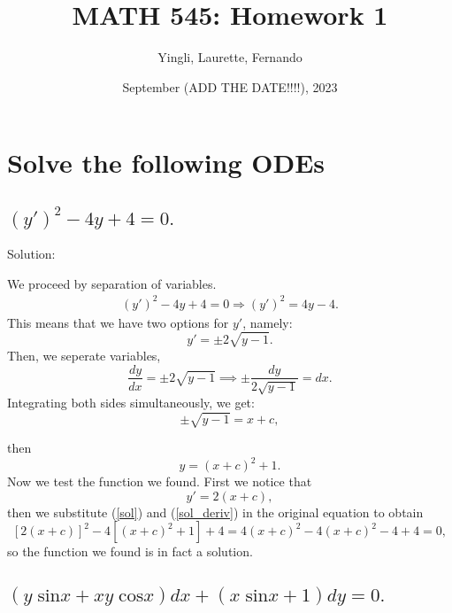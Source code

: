 \documentclass{article}
\title{MATH 545: Homework 1}
\author{Yingli, Laurette, Fernando}
\date{September (ADD THE DATE!!!!), 2023}
\begin{document}
\maketitle
\section{Solve the following ODEs}
	\subsection{ $(y')^2 -4y +4 = 0.$}

		Solution:

		We proceed by separation of variables.
		\begin{align*}
			(y')^2 -4y +4 = 0 \Longrightarrow (y')^2 = 4y -4. %
		\end{align*}
		This means that we have two options for $y'$, namely:
		\[y' = \pm 2\sqrt{y-1}.\]
	Then, we seperate variables,
	\[ \frac{dy}{dx} = \pm 2\sqrt{y-1} \implies \pm\frac{dy}{ 2\sqrt{y-1}} = dx.\]
		Integrating both sides simultaneously, we get:
		\[\pm \sqrt{y-1} = x+c,\]

		then
		\begin{equation} \label{sol}
			y = (x+c)^2 + 1.
		\end{equation}
		Now we test the function we found. First we notice that
		\begin{equation} \label{sol_deriv}
			y' = 2(x+c),
		\end{equation}
		then we substitute (\ref{sol}) and (\ref{sol_deriv}) in the original equation to obtain
		\[ [2(x+c)]^2 -4[(x+c)^2 + 1] +4= 4(x+c)^2 -4(x+c)^2 -4 + 4 =0,\]
		so the function we found is in fact a solution.

		\subsection{$(y\;\text{sin} x + xy\;\text{cos}x)dx + (x\;\text{sin}x + 1)dy = 0.$}
\end{document}
